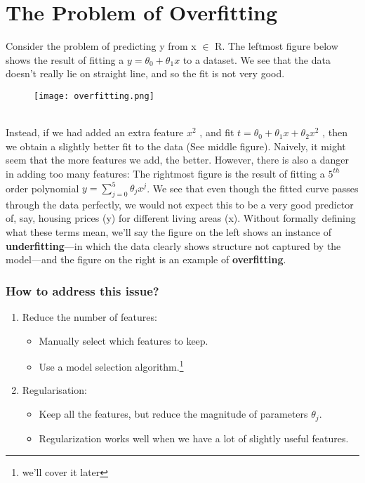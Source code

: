 \section{The Problem of Overfitting}
  Consider the problem of predicting y from x $\in$ R. The leftmost figure below shows the result of fitting a $y = \theta_0+\theta_1x$ to a dataset. We see that the data doesn’t really lie on straight line, and so the fit is not very good.\\ 
  \begin{figure}[h]
    \centering
    \texttt{[image: overfitting.png]}
  \end{figure}
  \\
  Instead, if we had added an extra feature $x^2$ , and fit $ t = \theta_0 + \theta_1x + \theta_2x^2$ , then we obtain a slightly better fit to the data (See middle figure). Naively, it might seem that the more features we add, the better. However, there is also a danger in adding too many features: The rightmost figure is the result of fitting a $5^{th}$ order polynomial $y = \sum_{j=0} ^5 \theta_j x^j$. We see that even though the fitted curve passes through the data perfectly, we would not expect this to be a very good predictor of, say, housing prices (y) for different living areas (x). Without formally defining what these terms mean, we’ll say the figure on the left shows an instance of \textbf{underfitting}—in which the data clearly shows structure not captured by the model—and the figure on the right is an example of \textbf{overfitting}.

    \subsubsection{How to address this issue?}
      \begin{enumerate}
        \item Reduce the number of features:
        \begin{itemize}
          \item Manually select which features to keep.
          \item Use a model selection algorithm.\footnote[2]{we'll cover it later}
        \end{itemize}
        \item Regularisation:
        \begin{itemize}
          \item Keep all the features, but reduce the magnitude of parameters $\theta_j$.
          \item Regularization works well when we have a lot of slightly useful features.
        \end{itemize}
      \end{enumerate}

